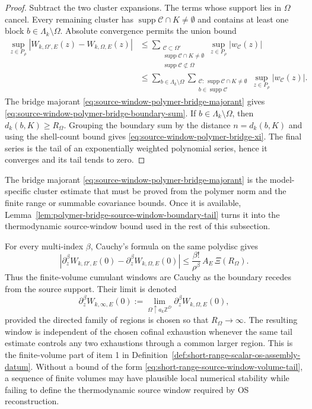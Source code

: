\begin{proof}
Subtract the two cluster expansions.  The terms whose support lies in
\(\Omega\) cancel.  Every remaining cluster has
\(\operatorname{supp}\mathcal C\cap K\neq\emptyset\) and contains at least
one block \(b\in\Lambda_k\setminus\Omega\).  Absolute convergence permits the
union bound
\[
\begin{aligned}
  \sup_{z\in P_\rho}
  |W_{k,\Omega',E}(z)-W_{k,\Omega,E}(z)|
  &\leq
  \sum_{\substack{\mathcal C\subset\Omega'\\
    \operatorname{supp}\mathcal C\cap K\neq\emptyset\\
    \operatorname{supp}\mathcal C\not\subset\Omega}}
  \sup_{z\in P_\rho}|w_{\mathcal C}(z)|                                     \\
  &\leq
  \sum_{b\in\Lambda_k\setminus\Omega}
  \sum_{\substack{\mathcal C:\,
    \operatorname{supp}\mathcal C\cap K\neq\emptyset\\
    b\in\operatorname{supp}\mathcal C}}
  \sup_{z\in P_\rho}|w_{\mathcal C}(z)| .
\end{aligned}
\]
The bridge majorant
\eqref{eq:source-window-polymer-bridge-majorant} gives
\eqref{eq:source-window-polymer-bridge-boundary-sum}.  If
\(b\in\Lambda_k\setminus\Omega\), then \(d_k(b,K)\geq R_\Omega\).  Grouping
the boundary sum by the distance \(n=d_k(b,K)\) and using the shell-count
bound gives \eqref{eq:source-window-polymer-bridge-xi}.  The final series is
the tail of an exponentially weighted polynomial series, hence it converges
and its tail tends to zero.
\end{proof}

The bridge majorant
\eqref{eq:source-window-polymer-bridge-majorant} is the model-specific
cluster estimate that must be proved from the polymer norm and the finite
range or summable covariance bounds.  Once it is available,
Lemma~\ref{lem:polymer-bridge-source-window-boundary-tail} turns it into the
thermodynamic source-window bound used in the rest of this subsection.

For every multi-index \(\beta\), Cauchy's formula on the same polydisc gives
\begin{equation}
  \left|
    \partial_z^\beta W_{k,\Omega',E}(0)
    -
    \partial_z^\beta W_{k,\Omega,E}(0)
  \right|
  \leq
  \frac{\beta!}{\rho^\beta}\,A_E\,\Xi(R_\Omega).
  \label{eq:short-range-source-window-volume-cauchy-bound}
\end{equation}
Thus the finite-volume cumulant windows are Cauchy as the boundary recedes
from the source support.  Their limit is denoted
\[
  \partial_z^\beta W_{k,\infty,E}(0)
  :=
  \lim_{\Omega\uparrow a_k\mathbb Z^D}
  \partial_z^\beta W_{k,\Omega,E}(0),
  \]
provided the directed family of regions is chosen so that
\(R_\Omega\to\infty\).  The resulting window is independent of the chosen
cofinal exhaustion whenever the same tail estimate controls any two
exhaustions through a common larger region.  This is the finite-volume part
of item 1 in
Definition~\ref{def:short-range-scalar-os-assembly-datum}.  Without a bound
of the form
\eqref{eq:short-range-source-window-volume-tail}, a sequence of finite
volumes may have plausible local numerical stability while failing to define
the thermodynamic source window required by OS reconstruction.

